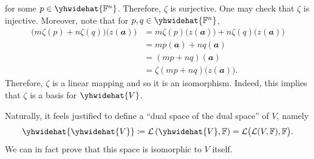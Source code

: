 \documentclass[math, code]{amznotes}
\theoremstyle{remark}
\begin{document}
for some $p \in \yhwidehat{\F^n}$. Therefore, $\zeta$ is surjective. One may check that $\zeta$ is injective. Moreover, note that for $p, q \in \yhwidehat{\F^n}$,
\begin{align*}
    \bigl(m\zeta(p) + n\zeta(q)\bigr)\bigl(z(\mathbfit{a})\bigr) & = m\zeta(p)\bigl(z(\mathbfit{a})\bigr) + n\zeta(q)\bigl(z(\mathbfit{a})\bigr) \\
    & = mp(\mathbfit{a}) + nq(\mathbfit{a}) \\
    & = (mp + nq)(\mathbfit{a}) \\
    & = \zeta(mp + nq)\bigl(z(\mathbfit{a})\bigr).
\end{align*}
Therefore, $\zeta$ is a linear mapping and so it is an isomorphism. Indeed, this implies that $\zeta$ is a basis for $\yhwidehat{V}$.

Naturally, it feels justified to define a ``dual space of the dual space'' of $V$, namely 
\begin{equation*}
    \yhwidehat{\yhwidehat{V}} \coloneqq \mathcal{L}\left(\yhwidehat{V}, \F\right) = \mathcal{L}\bigl(\mathcal{L}(V, \F), \F\bigr).
\end{equation*}
We can in fact prove that this space is isomorphic to $V$ itself. 
\end{document}

